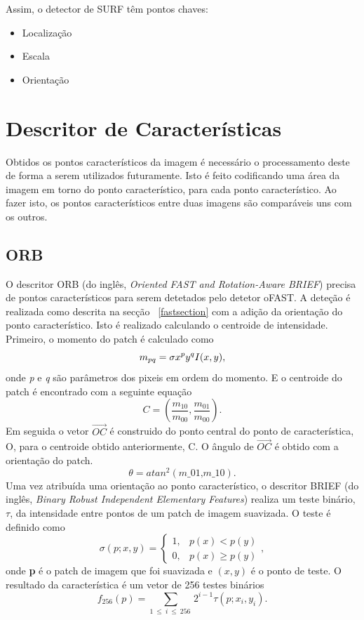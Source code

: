 Assim, o detector de SURF têm pontos chaves:
\begin{itemize}
	\item Localização
	\item Escala
	\item Orientação
\end{itemize}


\section{Descritor de Características}

Obtidos os pontos característicos da imagem é necessário o processamento deste de forma a serem utilizados futuramente. Isto é feito codificando uma área da imagem em torno do ponto característico, para cada ponto característico. Ao fazer isto, os pontos característicos entre duas imagens são comparáveis uns com os outros.


\subsection{ORB}

O descritor ORB (do inglês, \textit{Oriented FAST and Rotation-Aware BRIEF}) precisa de pontos característicos para serem detetados pelo detetor oFAST. A deteção é realizada como descrita na secção ~\ref{fastsection} com a adição da orientação do ponto característico. Isto é realizado calculando o centroide de intensidade. Primeiro, o momento do patch é calculado como \[ \textit{$m_{pq}$} = \sigma \textit{$ x^py^qI$}(x,y) ,\]
onde \textit{p} e \textit{q} são parâmetros dos pixeis em ordem do momento. E o centroide do patch é encontrado com a seguinte equação \[ C = ( \frac{ \textit{m}_{10} }{ \textit{m}_{00}} ,  \frac{ \textit{m}_{01} }{ \textit{m}_{00}} ) . \]
Em seguida o vetor $\vec{OC}$ é construido do ponto central do ponto de característica, O, para o centroide obtido anteriormente, C. O ângulo de $\vec{OC}$ é obtido com a orientação do patch. \[ \theta = atan^2(\textit{m_{01},m_{10}}) . \]
Uma vez atribuída uma orientação ao ponto característico, o descritor BRIEF (do inglês, \textit{Binary Robust Independent Elementary Features}) realiza um teste binário, $\tau$, da intensidade entre pontos de um patch de imagem suavizada. O teste é definido como  \[\sigma\left(p;x,y\right) = \left\{\begin{array}{cc}
1, & p(x)<p(y) \\ 
0, & p(x) \geq  p(y)   
\end{array}\right.
 ,\]
onde \textbf{p} é o patch de imagem que foi suavizada e \textbf{$(x,y)$} é o ponto de teste.
O resultado da característica é um vetor de 256 testes binários \[ f_{256} \left( p \right) = \sum_{1\ \le\ i\ \le\ 256\ } {2^{i-1}\tau\left(p;x_i,y_i\right) } . \]

